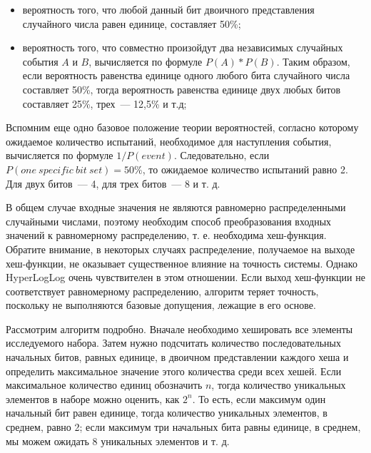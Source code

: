 \begin{itemize}
  \item вероятность того, что любой данный бит двоичного представления случайного числа равен единице, составляет 50\%;
  \item вероятность того, что совместно произойдут два независимых случайных события $A$ и $B$, вычисляется по формуле $P(A)*P(B)$. Таким образом, если вероятность равенства единице одного любого бита случайного числа составляет 50\%, тогда вероятность равенства единице двух любых битов составляет 25\%, трех~--- 12,5\% и т.д;
\end{itemize}

Вспомним еще одно базовое положение теории вероятностей, согласно которому ожидаемое количество испытаний, необходимое для наступления события, вычисляется по формуле $1/P(event)$. Следовательно, если $P(one\ specific\ bit\ set) = 50\%$, то ожидаемое количество испытаний равно 2. Для двух битов~--- 4, для трех битов~--- 8 и т. д.

В общем случае входные значения не являются равномерно распределенными случайными числами, поэтому необходим способ преобразования входных значений к равномерному распределению, т. е. необходима хеш-функция. Обратите внимание, в некоторых случаях распределение, получаемое на выходе хеш-функции, не оказывает существенное влияние на точность системы. Однако HyperLogLog очень чувствителен в этом отношении. Если выход хеш-функции не соответствует равномерному распределению, алгоритм теряет точность, поскольку не выполняются базовые допущения, лежащие в его основе.

Рассмотрим алгоритм подробно. Вначале необходимо хешировать все элементы исследуемого набора. Затем нужно подсчитать количество последовательных начальных битов, равных единице, в двоичном представлении каждого хеша и определить максимальное значение этого количества среди всех хешей. Если максимальное количество единиц обозначить $n$, тогда количество уникальных элементов в наборе можно оценить, как $2^n$. То есть, если максимум один начальный бит равен единице, тогда количество уникальных элементов, в среднем, равно 2; если максимум три начальных бита равны единице, в среднем, мы можем ожидать 8 уникальных элементов и т. д.

